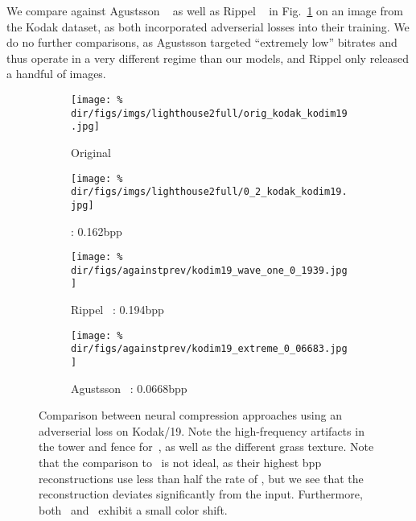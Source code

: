 \begin{subappendices}
We compare against Agustsson \etal~\cite{agustsson2019extreme} as well as Rippel \etal~\cite{rippel17a} in Fig.~\ref{hific:fig:others} on an image from the Kodak dataset, as both incorporated adverserial losses into their training. We do no further comparisons, as Agustsson \etal targeted ``extremely low'' bitrates and thus operate in a very different regime than our models, and Rippel \etal only released a handful of images.

\begin{figure}[ht]
\captionsetup[subfigure]{labelformat=empty,singlelinecheck=false,skip=1pt,font=small}
\centering
\begin{subfigure}[t]{.35\textwidth}
  \texttt{[image: \%
    \\dir/figs/imgs/lighthouse2full/orig\_kodak\_kodim19.jpg]}
  \caption{Original}
\end{subfigure}
\begin{subfigure}[t]{.35\textwidth}
  \texttt{[image: \%
    \\dir/figs/imgs/lighthouse2full/0\_2\_kodak\_kodim19.jpg]}
  \caption{\nameourslo: 0.162bpp}
\end{subfigure}
\begin{subfigure}[t]{.35\textwidth}
  \texttt{[image: \%
    \\dir/figs/againstprev/kodim19\_wave\_one\_0\_1939.jpg]}
  \caption{Rippel \etal~\cite{rippel17a}: 0.194bpp}
\end{subfigure}
\begin{subfigure}[t]{.35\textwidth}
  \texttt{[image: \%
    \\dir/figs/againstprev/kodim19\_extreme\_0\_06683.jpg]}
  \caption{Agustsson \etal~\cite{agustsson2019extreme}: 0.0668bpp}
\end{subfigure}
    \caption{\label{hific:fig:others}Comparison between neural compression approaches using an adverserial loss on Kodak/19. Note the high-frequency artifacts in the tower and fence for~\cite{rippel17a}, as well as the different grass texture. Note that the comparison to~\cite{agustsson2019extreme} is  not ideal, as their highest bpp reconstructions use less than half the rate of \ename, but we see that the reconstruction deviates significantly from the input. Furthermore, both~\cite{rippel17a} and~\cite{agustsson2019extreme} exhibit a small color shift.}
\end{figure}

\FloatBarrier


\end{subappendices}
